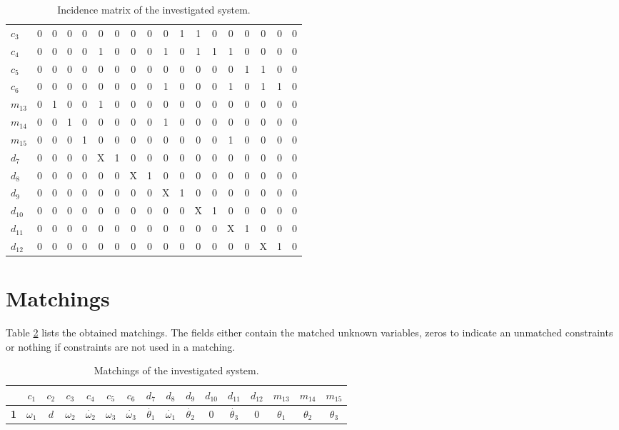 \documentclass[a4,11pt]{article}
\begin{document}
\begin{table}[!htb]
\begin{tabular}{|l|cccc|ccccccccccccc|}
$c_3$  & 0 & 0 & 0 & 0 & 0 & 0 & 0 & 0 & 0 & 1 & 1 & 0 & 0 & 0 & 0 & 0 & 0 \\ 
$c_4$  & 0 & 0 & 0 & 0 & 1 & 0 & 0 & 0 & 1 & 0 & 1 & 1 & 1 & 0 & 0 & 0 & 0 \\ 
$c_5$  & 0 & 0 & 0 & 0 & 0 & 0 & 0 & 0 & 0 & 0 & 0 & 0 & 0 & 1 & 1 & 0 & 0 \\ 
$c_6$  & 0 & 0 & 0 & 0 & 0 & 0 & 0 & 0 & 1 & 0 & 0 & 0 & 1 & 0 & 1 & 1 & 0 \\ 
$m_13$  & 0 & 1 & 0 & 0 & 1 & 0 & 0 & 0 & 0 & 0 & 0 & 0 & 0 & 0 & 0 & 0 & 0 \\ 
$m_14$  & 0 & 0 & 1 & 0 & 0 & 0 & 0 & 0 & 1 & 0 & 0 & 0 & 0 & 0 & 0 & 0 & 0 \\ 
$m_15$  & 0 & 0 & 0 & 1 & 0 & 0 & 0 & 0 & 0 & 0 & 0 & 0 & 1 & 0 & 0 & 0 & 0 \\ 
\hline
$d_7$  & 0 & 0 & 0 & 0 & X & 1 & 0 & 0 & 0 & 0 & 0 & 0 & 0 & 0 & 0 & 0 & 0 \\ 
$d_8$  & 0 & 0 & 0 & 0 & 0 & 0 & X & 1 & 0 & 0 & 0 & 0 & 0 & 0 & 0 & 0 & 0 \\ 
$d_9$  & 0 & 0 & 0 & 0 & 0 & 0 & 0 & 0 & X & 1 & 0 & 0 & 0 & 0 & 0 & 0 & 0 \\ 
$d_10$  & 0 & 0 & 0 & 0 & 0 & 0 & 0 & 0 & 0 & 0 & X & 1 & 0 & 0 & 0 & 0 & 0 \\ 
$d_11$  & 0 & 0 & 0 & 0 & 0 & 0 & 0 & 0 & 0 & 0 & 0 & 0 & X & 1 & 0 & 0 & 0 \\ 
$d_12$  & 0 & 0 & 0 & 0 & 0 & 0 & 0 & 0 & 0 & 0 & 0 & 0 & 0 & 0 & X & 1 & 0 \\ \hline
\end{tabular}
\caption{Incidence matrix of the investigated system.}
\label{tab:matrix}
\end{table}
\newpage
\section{Matchings}
Table \ref{tab:matchings} lists the obtained matchings. The fields either contain the matched unknown variables, zeros to indicate an unmatched constraints or nothing if constraints are not used in a matching.\setlength\tabcolsep{2mm}

\begin{table}[!htb]
\centering
\normalsize
\begin{tabular}{|c|c|c|c|c|c|c|c|c|c|c|c|c|c|c|c|}
\hline
~ & \textbf{$c_1$} & \textbf{$c_2$} & \textbf{$c_3$} & \textbf{$c_4$} & \textbf{$c_5$} & \textbf{$c_6$} & \textbf{$d_7$} & \textbf{$d_8$} & \textbf{$d_9$} & \textbf{$d_10$} & \textbf{$d_11$} & \textbf{$d_12$} & \textbf{$m_13$} & \textbf{$m_14$} & \textbf{$m_15$}\\ \hline 
\textbf{1} & $\omega_1$ & $d$ & $\omega_2$ & $\dot{\omega_2}$ & $\omega_3$ & $\dot{\omega_3}$ & $\dot{\theta_1}$ & $\dot{\omega_1}$ & $\dot{\theta_2}$ & 0 & $\dot{\theta_3}$ & 0 & $\theta_1$ & $\theta_2$ & $\theta_3$\\ \hline 
\end{tabular}
\caption{Matchings of the investigated system.}
\label{tab:matchings}
\end{table}
\end{document}
